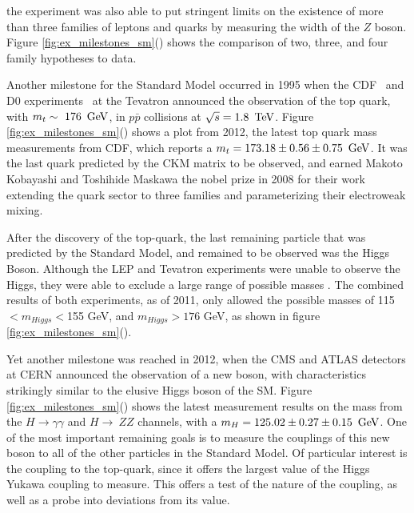 \noindent the experiment was also able to put stringent limits on the
existence of more than three families of leptons and quarks by
measuring the width of the $Z$ boson.  Figure
\ref{fig:ex_milestones_sm}() shows the
comparison of two, three, and four family hypotheses to data.   

\par Another milestone for the Standard Model occurred in 1995 when the
CDF~\cite{ex:CDF_topQuark} and D0 experiments~\cite{ex:D0_topQuark} at
the Tevatron announced the observation of the top quark, with
$m_{t}\sim~176~\,\text{Ge\hspace{-.08em}V}$, in $p\bar{p}$ collisions at $\sqrt{s}=1.8~\,\text{Te\hspace{-.08em}V}$.
Figure \ref{fig:ex_milestones_sm}() shows a
plot from 2012, the latest top quark mass measurements from CDF, which
reports a $m_{t} = 173.18 \pm 0.56 \pm 0.75~\,\text{Ge\hspace{-.08em}V}$. It was the last
quark predicted by the CKM matrix to be observed, and earned Makoto
Kobayashi and Toshihide Maskawa the nobel prize in 2008 for their work
extending the quark sector to three families and parameterizing their
electroweak mixing.

\par After the discovery of the top-quark, the last remaining particle
that was predicted by the Standard Model, and remained to be observed
was the Higgs Boson.  Although the LEP and Tevatron experiments were
unable to observe the Higgs, they were able to exclude a large range
of possible masses \cite{CDFandD0:2011aa}.  The combined results of
both experiments, as of 2011, only allowed the possible masses of 115
$< m_{Higgs} <$155 GeV, and $m_{Higgs}>176$ GeV, as shown in figure
\ref{fig:ex_milestones_sm}().  

\par Yet another milestone was reached in 2012, when the CMS and ATLAS
detectors at CERN announced the observation of a new boson, with
characteristics strikingly similar to the elusive Higgs boson of the
SM.  Figure \ref{fig:ex_milestones_sm}() shows
the latest measurement results on the mass from the
$H\rightarrow\gamma\gamma$ and $H\rightarrow~ZZ$ channels, with a
$m_{H} = 125.02 \pm 0.27 \pm 0.15~\,\text{Ge\hspace{-.08em}V}$.  One of the most important
remaining goals is to measure the couplings of this new boson to all
of the other particles in the Standard Model.  Of particular interest
is the coupling to the top-quark, since it offers the largest value of
the Higgs Yukawa coupling to measure.  This offers a test of the
nature of the coupling, as well as a probe into deviations from its
value.   


